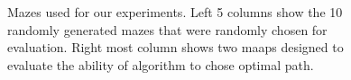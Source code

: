 \begin{figure}[t!]%
\centering%

\caption{Mazes used for our experiments. Left 5 columns show the 10 randomly generated mazes that were randomly chosen for evaluation. Right most column shows two maaps designed to evaluate the ability of algorithm to chose optimal path.}%
\label{fig:environments}
\end{figure}
